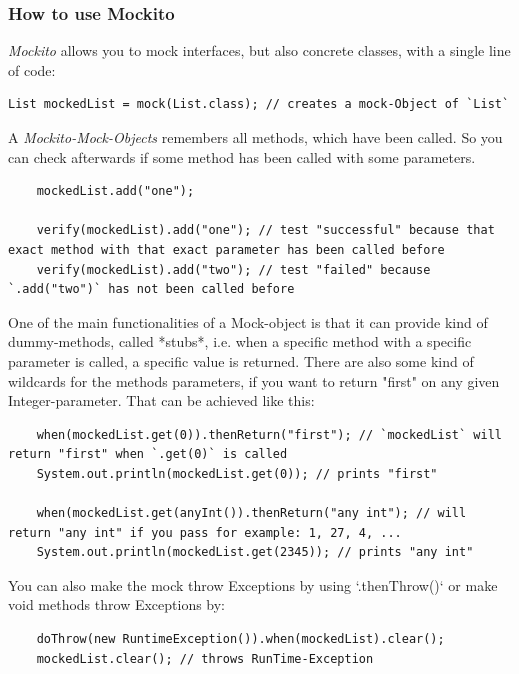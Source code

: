 \documentclass[11pt, a4paper]{article}
\begin{document}
\subsubsection{How to use Mockito}

\textit{Mockito} allows you to mock interfaces, but also concrete classes, with a single line of code:
	
\begin{lstlisting} 
List mockedList = mock(List.class); // creates a mock-Object of `List` 
\end{lstlisting}
	
A \textit{Mockito-Mock-Objects} remembers all methods, which have been called. So you can check afterwards if some method has been called with some parameters.
	
\begin{lstlisting}
	mockedList.add("one");
	    
	verify(mockedList).add("one"); // test "successful" because that exact method with that exact parameter has been called before
	verify(mockedList).add("two"); // test "failed" because `.add("two")` has not been called before
\end{lstlisting}

One of the main functionalities of a Mock-object is that it can provide kind of dummy-methods, called *stubs*, i.e. when a specific method with a specific parameter is called, a specific
value is returned. There are also some kind of wildcards for the methods parameters, if you want to return "first" on any given Integer-parameter. That can be achieved like this:

\begin{lstlisting}
    when(mockedList.get(0)).thenReturn("first"); // `mockedList` will return "first" when `.get(0)` is called
    System.out.println(mockedList.get(0)); // prints "first"
    
    when(mockedList.get(anyInt()).thenReturn("any int"); // will return "any int" if you pass for example: 1, 27, 4, ...
    System.out.println(mockedList.get(2345)); // prints "any int"
\end{lstlisting}

You can also make the mock throw Exceptions by using `.thenThrow()` or make void methods throw Exceptions by:

\begin{lstlisting}
    doThrow(new RuntimeException()).when(mockedList).clear();
    mockedList.clear(); // throws RunTime-Exception
\end{lstlisting}
\end{document}
